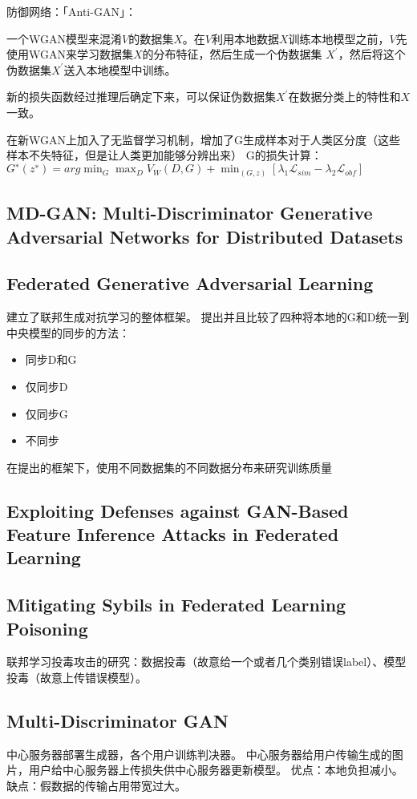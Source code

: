 \documentclass[12pt, a4paper]{article}
\begin{document}
            防御网络：「Anti-GAN」：

            一个WGAN模型来混淆$ V $的数据集$ X $。在$ V $利用本地数据$ X $训练本地模型之前，$ V $先使用WGAN来学习数据集$ X $的分布特征，然后生成一个伪数据集 $ X^\prime $，然后将这个伪数据集$ X^\prime $送入本地模型中训练。

            新的损失函数经过推理后确定下来，可以保证伪数据集$ X^\prime $在数据分类上的特性和$ X $一致。

            在新WGAN上加入了无监督学习机制，增加了G生成样本对于人类区分度（这些样本不失特征，但是让人类更加能够分辨出来）
            G的损失计算：$ 𝐺^∗(𝑧^∗)=𝑎𝑟𝑔 \min_𝐺  \max_𝐷 𝑉_𝑊 (𝐷,𝐺)+\min_(𝐺,𝑧) [\lambda_1 \mathcal{L}_{sim}−\lambda_2 \mathcal{L}_{obf} ] $
        \subsection*{MD-GAN: Multi-Discriminator Generative Adversarial Networks for Distributed Datasets}
        \subsection*{Federated Generative Adversarial Learning}
            建立了联邦生成对抗学习的整体框架。
            提出并且比较了四种将本地的G和D统一到中央模型的同步的方法：
            \begin{itemize}
                \item 同步D和G
                \item 仅同步D
                \item 仅同步G
                \item 不同步
            \end{itemize}
            在提出的框架下，使用不同数据集的不同数据分布来研究训练质量
        \subsection*{Exploiting Defenses against GAN-Based Feature Inference Attacks in Federated Learning}
        \subsection*{Mitigating Sybils in Federated Learning Poisoning}
            联邦学习投毒攻击的研究：数据投毒（故意给一个或者几个类别错误label）、模型投毒（故意上传错误模型）。
        \subsection*{Multi-Discriminator GAN}
            中心服务器部署生成器，各个用户训练判决器。
            中心服务器给用户传输生成的图片，用户给中心服务器上传损失供中心服务器更新模型。
            优点：本地负担减小。
            缺点：假数据的传输占用带宽过大。

    
    
\end{document}
